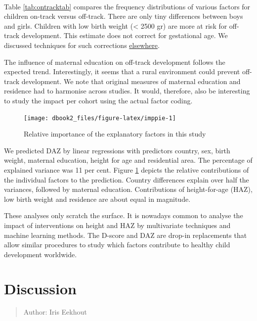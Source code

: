 \documentclass[
]{book}
\begin{document}
~

Table \ref{tab:ontracktab} compares the frequency distributions of various factors for children on-track versus off-track. There are only tiny differences between boys and girls. Children with low birth weight (\textless{} 2500 gr) are more at risk for off-track development. This estimate does not correct for gestational age. We discussed techniques for such corrections \href{https://d-score.org/dbook1/sec-pops.html}{elsewhere}.

The influence of maternal education on off-track development follows the expected trend. Interestingly, it seems that a rural environment could prevent off-track development. We note that original measures of maternal education and residence had to harmonise across studies. It would, therefore, also be interesting to study the impact per cohort using the actual factor coding.

\begin{figure}

{\centering \texttt{[image: dbook2\_files/figure-latex/imppie-1]} 

}

\caption{Relative importance of the explanatory factors in this study}\label{fig:imppie}
\end{figure}



We predicted DAZ by linear regressions with predictors country, sex, birth weight, maternal education, height for age and residential area. The percentage of explained variance was 11 per cent. Figure \ref{fig:imppie} depicts the relative contributions of the individual factors to the prediction. Country differences explain over half the variances, followed by maternal education. Contributions of height-for-age (HAZ), low birth weight and residence are about equal in magnitude.

These analyses only scratch the surface. It is nowadays common to analyse the impact of interventions on height and HAZ by multivariate techniques and machine learning methods. The D-score and DAZ are drop-in replacements that allow similar procedures to study which factors contribute to healthy child development worldwide.

\hypertarget{ch:discussion2}{%
\chapter{Discussion}\label{ch:discussion2}}

\begin{quote}
Author: Iris Eekhout
\end{quote}
\end{document}
